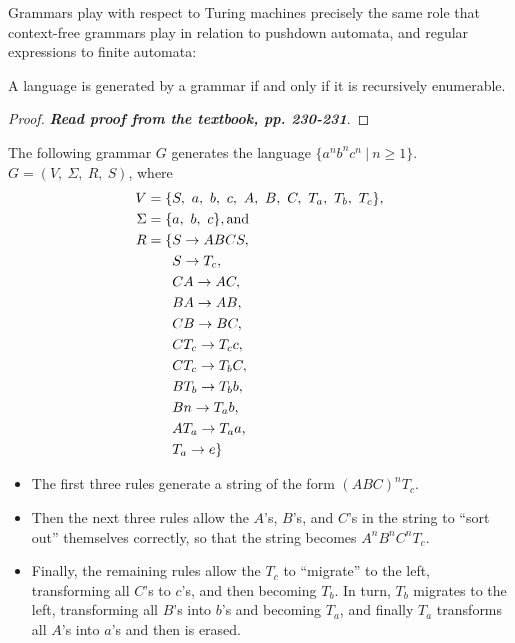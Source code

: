 Grammars play with respect to Turing machines precisely the same role that context-free grammars play in relation to pushdown automata, and regular expressions to finite automata:
\begin{theorem}{}
  A language is generated by a grammar if and only if it is recursively enumerable.  
\end{theorem}
\begin{proof}
  \textbf{\textit{Read proof from the textbook, {pp. 230-231}}}.
\end{proof}

\vspace*{\fill}
\columnbreak

\begin{example}{}
The following grammar $G$ generates the language $\{ a^nb^nc^n\ |\ n \geq 1 \}$. $G = (V,\ \Sigma,\ R,\ S)$, where
\begin{align*}
  V = \{ &S,\ a,\ b,\ c,\ A,\ B,\ C,\ T_a,\ T_b,\ T_c \},\\
  \Sigma = \{ &a,\ b,\ c \}, \textnormal{and}\\
  R = \{
      &S \rightarrow ABCS, \\
      &S \rightarrow T_c,  \\
      &CA \rightarrow AC,  \\
      &BA \rightarrow AB,  \\
      &CB \rightarrow BC,  \\
      &CT_c \rightarrow T_cc,  \\
      &CT_c \rightarrow T_bC,  \\
      &BT_b \rightarrow T_bb,  \\
      &Bn \rightarrow T_ab,  \\
      &AT_a \rightarrow T_aa,  \\
      &T_a \rightarrow e
  \}
\end{align*}
\begin{itemize}
  \item The first three rules generate a string of the form $(ABC)^nT_c$.
  \item Then the next three rules allow the $A$'s, $B$'s, and $C$'s in the string to ``sort out'' themselves correctly, so that the string becomes $A^nB^nC^nT_c$.
  \item Finally, the remaining rules allow the $T_c$ to ``migrate'' to the left, transforming all $C$'s to $c$'s, and then becoming $T_b$. In turn, $T_b$ migrates to the left, transforming all $B$'s into $b$'s and becoming $T_a$, and finally $T_a$ transforms all $A$'s into $a$'s and then is erased.
\end{itemize}
\end{example}

